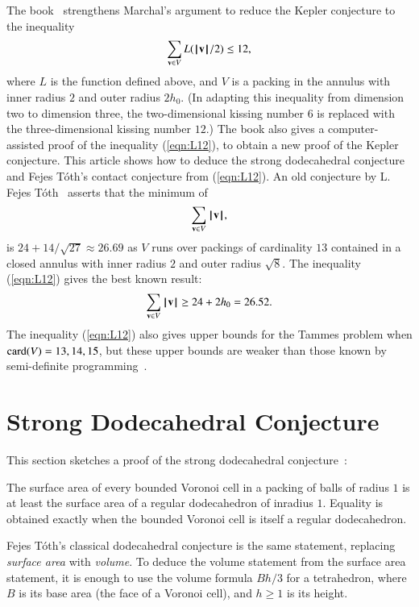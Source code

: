 \documentclass{llncs}
\begin{document}
\begin{remark}
The book~\cite{DSP} strengthens Marchal's argument to reduce
the Kepler conjecture to the inequality
\begin{equation}\label{eqn:L12}
\sum_{{\mathbf v} \in V} L({{\hskip0.1em|\hskip-0.15em|\hskip0.1em}{\mathbf v}{\hskip0.1em|\hskip-0.15em|\hskip0.1em}}/2) \le 12,
\end{equation}
where $L$ is the function defined above, and $V$ is a packing in the
annulus with inner radius $2$ and outer radius $2h_0$.  (In adapting
this inequality from dimension two to dimension three, the
two-dimensional kissing number $6$ is replaced with the
three-dimensional kissing number $12$.) The book also gives a
computer-assisted proof of the inequality (\ref{eqn:L12}), to obtain a
new proof of the Kepler conjecture.  This article shows how to deduce
the strong dodecahedral conjecture and Fejes T\'oth's contact
conjecture from (\ref{eqn:L12}). An old conjecture by L. Fejes
T\'oth~\cite[p.~178]{Toth:1972:Lagerungen} asserts that the minimum of
\begin{equation}\label{eqn:FT}
\sum_{{\mathbf v}\in V} {{\hskip0.1em|\hskip-0.15em|\hskip0.1em}{\mathbf v}{\hskip0.1em|\hskip-0.15em|\hskip0.1em}},
\end{equation}
is $24+ 14/\sqrt{27}\approx 26.69$
as $V$ runs over packings of cardinality $13$ contained in a closed
annulus with inner radius $2$ and outer radius $\sqrt8$.  The
inequality (\ref{eqn:L12}) gives the best known result:
\begin{equation}
\sum_{{\mathbf v}\in V} {{\hskip0.1em|\hskip-0.15em|\hskip0.1em}{\mathbf v}{\hskip0.1em|\hskip-0.15em|\hskip0.1em}}\ge 24 + 2 h_0 = 26.52.
\end{equation}
The inequality (\ref{eqn:L12}) also gives upper bounds for the Tammes
problem when ${\operatorname{card}}(V)=13,14,15$, but these upper bounds are weaker
than those known by semi-definite programming~\cite{BV08}.
\end{remark}

\section{Strong Dodecahedral Conjecture}

This section sketches a proof of the strong dodecahedral conjecture~\cite{Bezdek00}:

\begin{theorem}
The surface area of every  bounded Voronoi cell in a packing of balls of radius $1$ is
at least the surface area of a regular dodecahedron of inradius $1$.  Equality is
obtained exactly when the bounded Voronoi cell is itself a regular dodecahedron.
\end{theorem}

\begin{remark} Fejes T\'oth's classical dodecahedral conjecture is the
  same statement, replacing {\it surface area} with {\it volume}.  To
  deduce the volume statement from the surface area statement, it is
  enough to use the volume formula $B h/3$ for a tetrahedron, where
  $B$ is its base area (the face of a Voronoi cell), and $h\ge 1$ is
  its height.
\end{remark}
\end{document}
